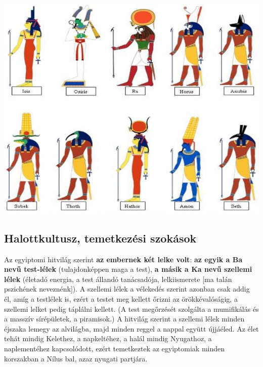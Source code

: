 \begin{tcolorbox}[enhanced,colframe=gray!50!white,
	colbacktitle=gray!15!white,
	coltitle=gray!50!black,
	borderline={0.5mm}{0mm}{gray!15!white},
	borderline={0.5mm}{0mm}{gray!50!white,dashed},
	attach boxed title to top center={yshift=-2mm},
	boxed title style={boxrule=0.4pt},
	title=Az ókori Egyiptom istenei]{
		\includegraphics[width=1.0\linewidth]{images/01/istenek}}
\end{tcolorbox}

\subsection*{Halottkultusz, temetkezési szokások}

	Az egyiptomi hitvilág szerint \textbf{az embernek két lelke volt}:\textbf{ az egyik a Ba nevű test-lélek} (tulajdonképpen maga a test), \textbf{a másik a Ka nevű szellemi lélek} (életadó energia, a test állandó tanácsadója, lelkiismerete [ma talán pszichének neveznénk]). A szellemi lélek a vélekedés szerint azonban csak addig él, amíg a testlélek is, ezért a testet meg kellett őrizni az örökkévalóságig, a szellemi lelket pedig táplálni kellett. (A test megőrzését szolgálta a mumifikálás és a masszív sírépületek, a piramisok.) A hitvilág szerint a szellemi lélek minden éjszaka lemegy az alvilágba, majd minden reggel a nappal együtt újjáéled. Az élet tehát mindig Kelethez, a napkeltéhez, a halál mindig Nyugathoz, a naplementéhez kapcsolódott, ezért temetkeztek az egyiptomiak minden korszakban a Nílus bal, azaz nyugati partjára.
	
